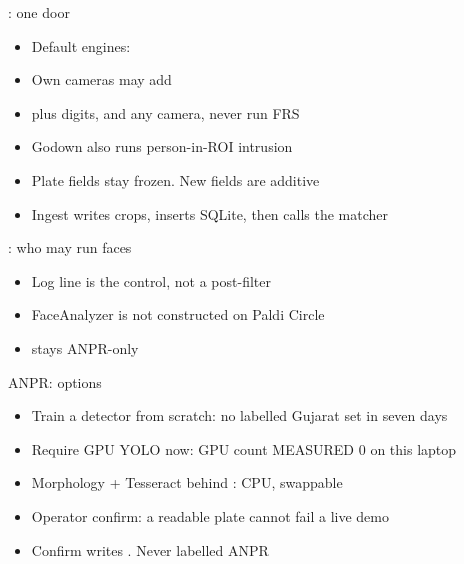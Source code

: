 \documentclass[aspectratio=169,11pt]{beamer}
\begin{document}
\begin{frame}{: one door}
\begin{itemize}\itemsep0.55em
\item Default engines: 
\item Own cameras may add 
\item {} plus digits, and any  camera, never run FRS
\item Godown  also runs person-in-ROI intrusion
\item Plate fields stay frozen. New fields are additive
\item Ingest writes crops, inserts SQLite, then calls the matcher
\end{itemize}
\end{frame}

\begin{frame}{: who may run faces}
\begin{center}\resizebox{0.92\textwidth}{!}{}\end{center}
\medskip
\begin{itemize}\itemsep0.45em
\item Log line  is the control, not a post-filter
\item FaceAnalyzer is not constructed on Paldi Circle
\item {} stays ANPR-only
\end{itemize}
\end{frame}

\begin{frame}{ANPR: options}
\begin{itemize}\itemsep0.55em
\item Train a detector from scratch: no labelled Gujarat set in seven days
\item Require GPU YOLO now: GPU count MEASURED 0 on this laptop
\item Morphology + Tesseract behind : CPU, swappable
\item Operator confirm: a readable plate cannot fail a live demo
\item Confirm writes . Never labelled ANPR
\end{itemize}
\end{frame}
\end{document}
